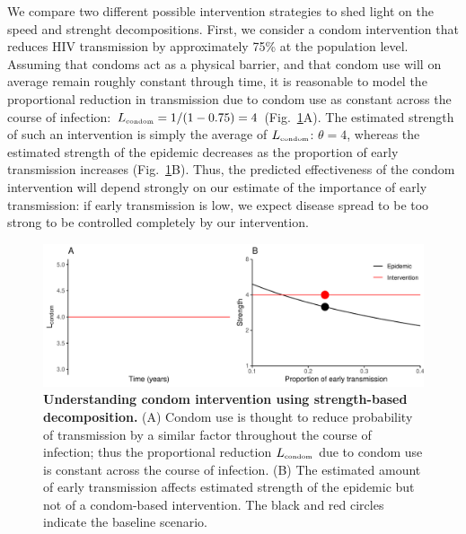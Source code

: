 \documentclass[12pt]{article}
\newcommand{\tsub}[2]{#1_{{\textrm{\tiny #2}}}}
\newcommand{\figref}[1]{Fig.~\ref{fig:#1}}
\newcommand{\figlab}[1]{\label{fig:#1}}
\begin{document}
We compare two different possible intervention strategies to shed light on the speed and strenght decompositions.
First, we consider a condom intervention that reduces HIV transmission by approximately 75\% at the population level.
Assuming that condoms act as a physical barrier, and that condom use will on average remain roughly constant through time, it is reasonable to model the proportional reduction in transmission due to condom use as constant across the course of infection: $\tsub{L}{condom} = 1/(1-0.75) = 4$  (\figref{condom}A).
The estimated strength of such an intervention is simply the average of $\tsub{L}{condom}$: $\theta=4$, whereas the estimated strength of the epidemic decreases as the proportion of early transmission increases (\figref{condom}B).
Thus, the predicted effectiveness of the condom intervention will depend strongly on our estimate of the importance of early transmission: if early transmission is low, we expect disease spread to be too strong to be controlled completely by our intervention.

\begin{figure}[!t]
\includegraphics[width=\textwidth]{../figure/condom.pdf}
\caption{
\textbf{Understanding condom intervention using strength-based decomposition.}
(A) Condom use is thought to reduce probability of transmission by a similar factor throughout the course of infection; thus the proportional reduction $\tsub{L}{condom}$ due to condom use is constant across the course of infection.
(B) The estimated amount of early transmission affects estimated strength of the epidemic but not of a condom-based intervention.
The black and red circles indicate the baseline scenario.
}
\figlab{condom}
\end{figure}
\end{document}
